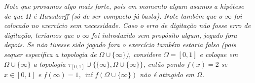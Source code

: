 \begin{dem}
\begin{oobs}
\textit{Note que provamos algo mais forte, pois em momento algum usamos a hipótese de que $\Omega$ é Hausdorff (só de ser compacto já basta). Note também que o $\infty$ foi colocado no exercício sem necessidade. Caso o erro de digitação não fosse erro de digitação, teríamos que o $\infty$ foi introduzido sem propósito algum, jogado fora depois. Se não tivesse sido jogado fora o exercício também estaria falso (pois sequer especifica a topologia de $\Omega \cup \{ \infty\}$), considere $\Omega =[0,1]$ e coloque em $\Omega \cup \{\infty\}$ a topologia $\tau_{[0,1]} \cup \{\{\infty \}, \Omega \cup \{\infty \}  \}$, então pondo $f(x) = 2$ se $x \in [0,1]$ e $f(\infty) = 1$, $\inf f(\Omega \cup \{\infty\})$ não é atingido em $\Omega$.}
\end{oobs}
\end{dem}

